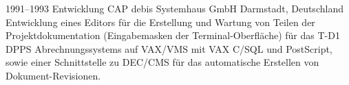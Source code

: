 \cventry
{1991--1993}
{Entwicklung}
{}
{CAP debis Systemhaus GmbH}
{Darmstadt, Deutschland}
{
  Entwicklung eines Editors für die Erstellung und Wartung von Teilen der Projektdokumentation
  (Eingabemasken der Terminal-Oberfläche) für das T-D1 DPPS Abrechnungssystems auf VAX/VMS mit
  VAX C/SQL und PostScript, sowie einer Schnittstelle zu DEC/CMS für das automatische Erstellen
  von Dokument-Revisionen.
}
